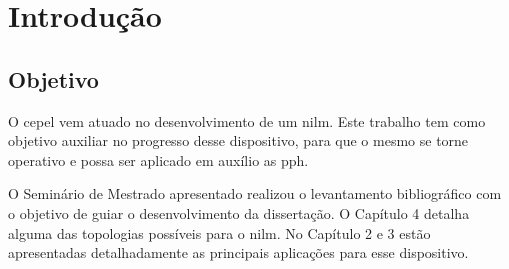 \chapter{Introdução}

\section{Objetivo}

O \gls{cepel} vem atuado no desenvolvimento de um \gls{nilm}. Este trabalho
tem como objetivo auxiliar no progresso desse dispositivo, para que o
mesmo se torne operativo e possa ser aplicado em auxílio as \gls{pph}.

O Seminário de Mestrado apresentado realizou o levantamento bibliográfico com o
objetivo de guiar o desenvolvimento da dissertação. O Capítulo 4 detalha alguma
das topologias possíveis para o \gls{nilm}. No Capítulo 2 e 3 estão
apresentadas detalhadamente as principais aplicações para esse dispositivo.






